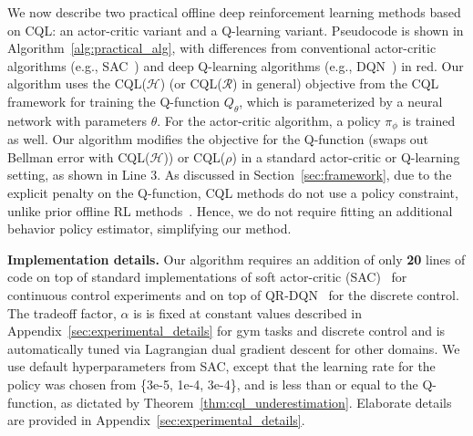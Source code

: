 We now describe two practical offline deep reinforcement learning methods based on CQL: an actor-critic variant and a Q-learning variant. Pseudocode is shown in Algorithm~\ref{alg:practical_alg}, with differences from conventional actor-critic algorithms (e.g., SAC~\citep{haarnoja}) and deep Q-learning algorithms (e.g., DQN~\citep{mnih2013playing}) in red.
Our algorithm uses the CQL($\mathcal{H}$) (or CQL($\mathcal{R}$) in general) objective from the CQL framework for training the Q-function $Q_\theta$, which is parameterized by a neural network with parameters $\theta$. For the actor-critic algorithm, a policy $\pi_\phi$ is trained as well. Our algorithm modifies the objective for the Q-function (swaps out Bellman error with CQL($\mathcal{H}$)) or CQL($\rho$)
in a standard actor-critic or Q-learning setting, as shown in Line 3. As discussed in Section~\ref{sec:framework}, due to the explicit penalty on the Q-function, CQL methods do not use a policy constraint,
unlike prior offline RL methods~\citep{kumar2019stabilizing,wu2019behavior,siegel2020keep,levine2020offline}.
Hence, we do not require fitting an additional behavior policy estimator, simplifying our method. %

\textbf{Implementation details.} Our algorithm requires an addition of only \textbf{20} lines of code on top of standard implementations of soft actor-critic (SAC)~\citep{haarnoja} for continuous control experiments and on top of QR-DQN~\citep{dabney2018distributional} for the discrete control. The tradeoff factor, $\alpha$
is is fixed at constant values described in Appendix~\ref{sec:experimental_details} for gym tasks and discrete control and is automatically tuned via Lagrangian dual gradient descent for other domains. We use default hyperparameters from SAC, except that the learning rate for the policy was chosen from \{3e-5, 1e-4, 3e-4\}, and is less than or equal to the Q-function, as dictated by Theorem~\ref{thm:cql_underestimation}. Elaborate details are provided in Appendix~\ref{sec:experimental_details}.  

